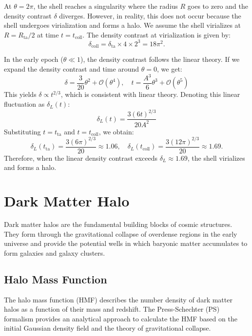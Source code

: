 At $\theta = 2\pi$, the shell reaches a singularity where the radius $R$ goes to zero and the density contrast $\delta$ diverges. However, in reality, this does not occur because the shell undergoes virialization and forms a halo. We assume the shell virializes at $R = R_{\text{ta}}/2$ at time $t = t_{\text{coll}}$. The density contrast at virialization is given by:
\begin{equation}
    \delta_{\text{coll}} = \delta_{\text{ta}} \times 4 \times 2^3 = 18\pi^2.
\end{equation}

In the early epoch ($\theta \ll 1$), the density contrast follows the linear theory. If we expand the density contrast and time around $\theta = 0$, we get:
\begin{equation}
    \delta = \frac{3}{20} \theta^2 + \mathcal{O}(\theta^4), \quad t = \frac{A^3}{6} \theta^3 + \mathcal{O}(\theta^5)
\end{equation}
This yields $\delta \propto t^{2/3}$, which is consistent with linear theory. Denoting this linear fluctuation as $\delta_L(t)$:
\begin{equation}
    \delta_L(t) = \frac{3(6t)^{2/3}}{20A^2}
\end{equation}
Substituting $t = t_{\text{ta}}$ and $t = t_{\text{coll}}$, we obtain:
\begin{equation}
    \delta_L(t_{\text{ta}}) = \frac{3(6\pi)^{2/3}}{20} \approx 1.06, \quad \delta_L(t_{\text{coll}}) = \frac{3(12\pi)^{2/3}}{20} \approx 1.69.
\end{equation}
Therefore, when the linear density contrast exceeds $\delta_L \approx 1.69$, the shell virializes and forms a halo.

\section{Dark Matter Halo}
\label{sec:halo}
Dark matter halos are the fundamental building blocks of cosmic structures. They form through the gravitational collapse of overdense regions in the early universe and provide the potential wells in which baryonic matter accumulates to form galaxies and galaxy clusters. 

\subsection{Halo Mass Function}
The halo mass function (HMF) describes the number density of dark matter halos as a function of their mass and redshift. The Press-Schechter (PS) formalism \citep{1974ApJ...187..425P} provides an analytical approach to calculate the HMF based on the initial Gaussian density field and the theory of gravitational collapse.

